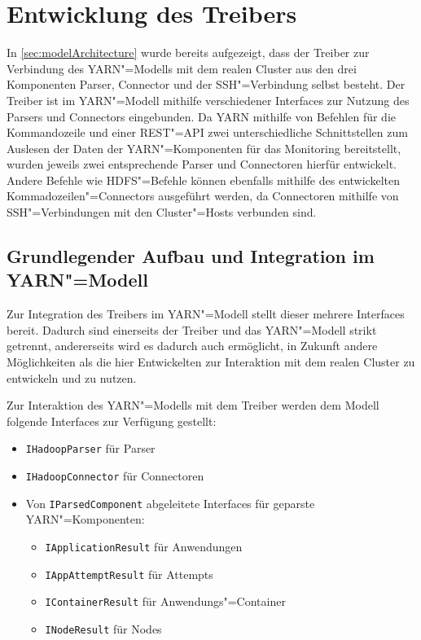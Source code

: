 \section{Entwicklung des Treibers}
\label{sec:sshDriver}

In \cref{sec:modelArchitecture} wurde bereits aufgezeigt, dass der Treiber zur Verbindung des \ac{YARN}"=Modells mit dem realen Cluster aus den drei Komponenten Parser, Connector und der SSH"=Verbindung selbst besteht.
Der Treiber ist im \ac{YARN}"=Modell mithilfe verschiedener Interfaces zur Nutzung des Parsers und Connectors eingebunden.
Da \ac{YARN} mithilfe von Befehlen für die Kommandozeile und einer REST"=API zwei unterschiedliche Schnittstellen zum Auslesen der Daten der \ac{YARN}"=Komponenten für das Monitoring bereitstellt, wurden jeweils zwei entsprechende Parser und Connectoren hierfür entwickelt.
Andere Befehle wie \zB \ac{HDFS}"=Befehle können ebenfalls mithilfe des entwickelten Kommadozeilen"=Connectors ausgeführt werden, da Connectoren mithilfe von SSH"=Verbindungen mit den Cluster"=Hosts verbunden sind.

\subsection{Grundlegender Aufbau und Integration im \acs{YARN}"=Modell}
\label{subsec:driverModelIntegration}

Zur Integration des Treibers im \ac{YARN}"=Modell stellt dieser mehrere Interfaces bereit.
Dadurch sind einerseits der Treiber und das YARN"=Modell strikt getrennt, andererseits wird es dadurch auch ermöglicht, in Zukunft andere Möglichkeiten als die hier Entwickelten zur Interaktion mit dem realen Cluster zu entwickeln und zu nutzen.

Zur Interaktion des YARN"=Modells mit dem Treiber werden dem Modell folgende Interfaces zur Verfügung gestellt:

\begin{itemize}
    \item \texttt{IHadoopParser} für Parser
    \item \texttt{IHadoopConnector} für Connectoren
    \item Von \texttt{IParsedComponent} abgeleitete Interfaces für geparste YARN"=Komponenten:
    \begin{itemize}
        \item \texttt{IApplicationResult} für Anwendungen
        \item \texttt{IAppAttemptResult} für Attempts
        \item \texttt{IContainerResult} für Anwendungs"=Container
        \item \texttt{INodeResult} für Nodes
    \end{itemize}
\end{itemize}

